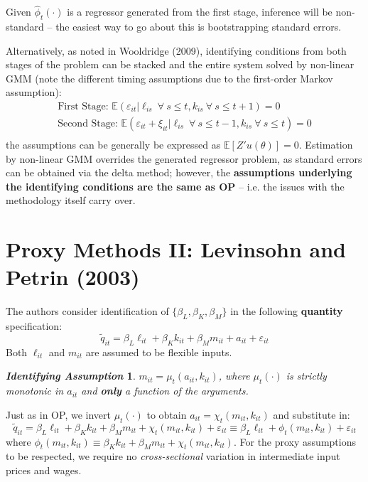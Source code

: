 \documentclass[11pt]{article}
\newtheorem*{idass}{\textit{Identifying Assumption}}
\begin{document}
Given $\hat{\phi}_t(\cdot)$ is a regressor generated from the first stage, inference will be non-standard -- the easiest way to go about this is bootstrapping standard errors.

Alternatively, as noted in Wooldridge (2009), identifying conditions from both stages of the problem can be stacked and the entire system solved by non-linear GMM (note the different timing assumptions due to the first-order Markov assumption):
\begin{equation}
	 \begin{gathered}
		 \text{First Stage:  } \mathbb{E}(\varepsilon_{it}| \ell_{is} ~\forall~s \leq t, k_{is} ~\forall~s \leq t+1)=0 \\
		 \text{Second Stage:  } \mathbb{E}(\varepsilon_{it} + \xi_{it}| \ell_{is} ~\forall~s \leq t-1, k_{is} ~\forall~s \leq t)=0 \\
	 \end{gathered}
\end{equation}
the assumptions can be generally be expressed as $\mathbb{E}[Z'u(\theta)] = 0$.
Estimation by non-linear GMM overrides the generated regressor problem, as standard errors can be obtained via the delta method; however, the \textbf{assumptions underlying the identifying conditions are the same as OP} -- i.e. the issues with the methodology itself carry over.

\section{Proxy Methods II: Levinsohn and Petrin (2003)}
The authors consider identification of $\{\beta_L, \beta_K, \beta_M\}$ in the following \textbf{quantity} specification:
\begin{equation}
	\tilde{q}_{it} = \beta_L \ell_{it} + \beta_K k_{it} + \beta_M m_{it} + a_{it} + \varepsilon_{it}
\end{equation}
Both $\ell_{it}$ and $m_{it}$ are assumed to be flexible inputs.
\begin{idass}
	$m_{it} = \mu_t(a_{it}, k_{it})$, where $\mu_t(\cdot)$ is strictly monotonic in $a_{it}$ and \textbf{only} a function of the arguments.
\end{idass}
Just as in OP, we invert $\mu_t(\cdot)$ to obtain $a_{it} = \chi_t(m_{it}, k_{it})$ and substitute in:
\begin{equation}
		\tilde{q}_{it} = \beta_L \ell_{it} + \beta_K k_{it} + \beta_M m_{it} + \chi_t(m_{it}, k_{it}) + \varepsilon_{it} \equiv \beta_L \ell_{it} + \phi_t(m_{it}, k_{it}) + \varepsilon_{it}
\end{equation}
where $\phi_t(m_{it}, k_{it}) \equiv \beta_K k_{it} + \beta_M m_{it} + \chi_t(m_{it}, k_{it})$.
For the proxy assumptions to be respected, we require no \textit{cross-sectional} variation in intermediate input prices and wages.
\end{document}
